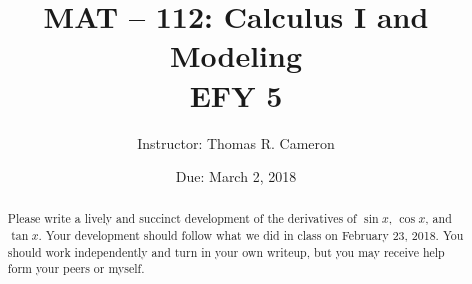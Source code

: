 \documentclass{article}
\title{MAT -- 112: Calculus I and Modeling\\
\large{EFY 5}}
\author{Instructor: Thomas R. Cameron}
\date{Due: March 2, 2018}
\begin{document}
\maketitle

\begin{abstract}
Please write a lively and succinct development of the derivatives of $\sin x$, $\cos x$, and $\tan x$. Your development should follow what we did in class on February 23, 2018. You should work independently and turn in your own writeup, but you may receive help form your peers or myself. 
\end{abstract}
\end{document}
